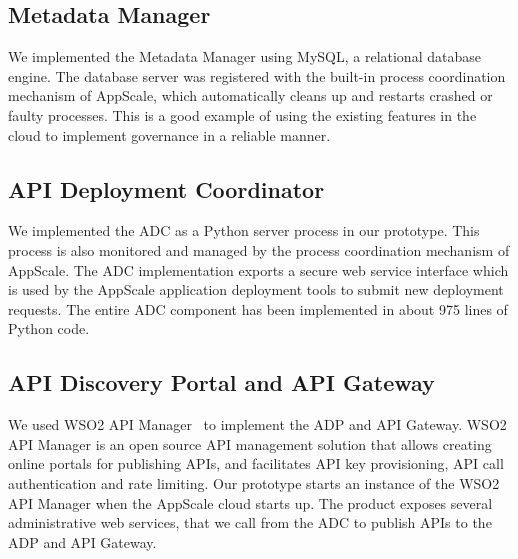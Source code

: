 \subsection{Metadata Manager}
We implemented the Metadata Manager using MySQL, a relational database engine. 
The database server was registered with the built-in process coordination mechanism of AppScale, which automatically
cleans up and restarts crashed or faulty processes. This is a good example of using the existing features in the cloud to implement
governance in a reliable manner.

\subsection{API Deployment Coordinator}
We implemented the ADC as a Python server process in our prototype. This process is also monitored and managed by the process
coordination mechanism of AppScale. The ADC implementation exports a secure web service interface which is used by the AppScale application 
deployment tools to submit new deployment requests. The entire ADC component has been implemented in about 975 lines of Python code. 

\subsection{API Discovery Portal and API Gateway}
We used WSO2 API Manager~\cite{wso2am} to implement the ADP and API Gateway. WSO2 API Manager is an open source API management solution that
allows creating online portals for publishing APIs, and facilitates API key provisioning, API call authentication and rate limiting. 
Our prototype starts an instance of the WSO2 API Manager when
the AppScale cloud starts up. The product exposes several
administrative web services, that we call from the ADC to publish APIs to the ADP and API Gateway. 
